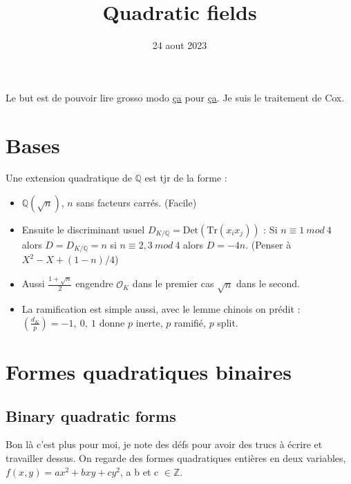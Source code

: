 \documentclass[12pt]{article}
\title{Quadratic fields}
\date{24 aout 2023}
\theoremstyle{plain}
\newcommand{\Z}{\mathbb{Z}}
\newcommand{\Q}{\mathbb{Q}}
\newcommand{\Det}{\textrm{Det}}
\newcommand{\Tr}{\textrm{Tr}}
\newcommand{\OK}{\mathcal{O}_{K}}
\begin{document}
\tableofcontents
\maketitle

Le but est de pouvoir lire grosso modo \href{file:///C:/Users/33771/Desktop/articles/Hilbert_class_poly_algo.pdf}{ça} 
pour \href{file:///C:/Users/33771/Desktop/modular_polynomials_via_isogeny_volcanoes.pdf}{ça}.
Je suis le traitement de Cox.

\section{Bases}
Une extension quadratique de $\Q$ est tjr de la forme :

\begin{itemize}
    \item $\Q(\sqrt{n})$, $n$ sans facteurs carrés. (Facile)
    \item Ensuite le discriminant usuel $D_{K/\Q}=\Det(\Tr(x_ix_j))$ : Si $n\equiv 1~mod~4$ alors $D=D_{K/\Q}=n$
    si $n\equiv 2,3~mod~4$ alors $D=-4n$. (Penser à $X^2-X+(1-n)/4$)
    \item Aussi $\frac{1+\sqrt{n}}{2}$ engendre $\OK$ dans le premier cas $\sqrt{n}$ dans le second.
    \item La ramification est simple aussi, avec le lemme chinois on prédit :\\
            $\left(\frac{d_K}{p}\right)=-1,~0,~1$ donne $p$ inerte, $p$ ramifié, $p$ split.
\end{itemize}


\section{Formes quadratiques binaires}
\subsection{Binary quadratic forms}
Bon là c'est plus pour moi, je note des défs pour avoir des trucs à écrire et travailler dessus.
On regarde des formes quadratiques entières en deux variables, $f(x,y)=ax^2+bxy+cy^2$, a b et c $\in\Z$.\\
\end{document}
